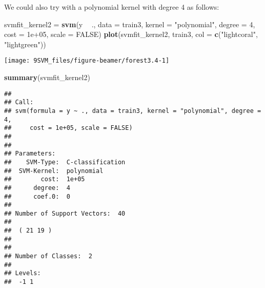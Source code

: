 \documentclass[10pt,ignorenonframetext,]{beamer}
\newenvironment{Shaded}{\begin{snugshade}}{\end{snugshade}}
\newcommand{\KeywordTok}[1]{\textcolor[rgb]{0.13,0.29,0.53}{\textbf{#1}}}
\newcommand{\DataTypeTok}[1]{\textcolor[rgb]{0.13,0.29,0.53}{#1}}
\newcommand{\DecValTok}[1]{\textcolor[rgb]{0.00,0.00,0.81}{#1}}
\newcommand{\FloatTok}[1]{\textcolor[rgb]{0.00,0.00,0.81}{#1}}
\newcommand{\StringTok}[1]{\textcolor[rgb]{0.31,0.60,0.02}{#1}}
\newcommand{\OtherTok}[1]{\textcolor[rgb]{0.56,0.35,0.01}{#1}}
\newcommand{\OperatorTok}[1]{\textcolor[rgb]{0.81,0.36,0.00}{\textbf{#1}}}
\newcommand{\NormalTok}[1]{#1}
\begin{document}
\begin{frame}[fragile]

We could also try with a polynomial kernel with degree 4 as follows:

\scriptsize

\begin{Shaded}
\begin{Highlighting}[]
\NormalTok{svmfit_kernel2 =}\StringTok{ }\KeywordTok{svm}\NormalTok{(y }\OperatorTok{~}\StringTok{ }\NormalTok{., }\DataTypeTok{data =}\NormalTok{ train3, }\DataTypeTok{kernel =} \StringTok{"polynomial"}\NormalTok{, }
    \DataTypeTok{degree =} \DecValTok{4}\NormalTok{, }\DataTypeTok{cost =} \FloatTok{1e+05}\NormalTok{, }\DataTypeTok{scale =} \OtherTok{FALSE}\NormalTok{)}
\KeywordTok{plot}\NormalTok{(svmfit_kernel2, train3, }\DataTypeTok{col =} \KeywordTok{c}\NormalTok{(}\StringTok{"lightcoral"}\NormalTok{, }\StringTok{"lightgreen"}\NormalTok{))}
\end{Highlighting}
\end{Shaded}

\begin{center}\texttt{[image: 9SVM\_files/figure-beamer/forest3.4-1]} \end{center}

\end{frame}

\begin{frame}[fragile]

\scriptsize

\begin{Shaded}
\begin{Highlighting}[]
\KeywordTok{summary}\NormalTok{(svmfit_kernel2)}
\end{Highlighting}
\end{Shaded}

\begin{verbatim}
## 
## Call:
## svm(formula = y ~ ., data = train3, kernel = "polynomial", degree = 4, 
##     cost = 1e+05, scale = FALSE)
## 
## 
## Parameters:
##    SVM-Type:  C-classification 
##  SVM-Kernel:  polynomial 
##        cost:  1e+05 
##      degree:  4 
##      coef.0:  0 
## 
## Number of Support Vectors:  40
## 
##  ( 21 19 )
## 
## 
## Number of Classes:  2 
## 
## Levels: 
##  -1 1
\end{verbatim}

\end{frame}
\end{document}
